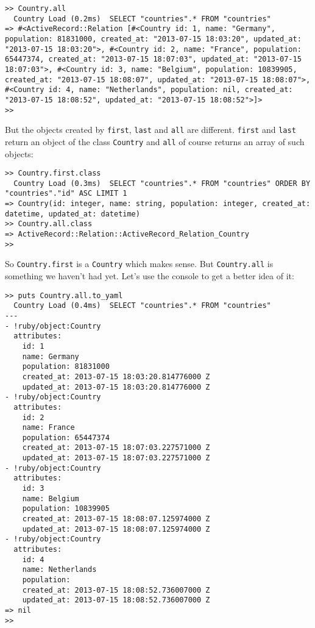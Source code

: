 \documentclass[a4paper]{book}
\begin{document}
\begin{shaded}\begin{verbatim}
>> Country.all
  Country Load (0.2ms)  SELECT "countries".* FROM "countries"
=> #<ActiveRecord::Relation [#<Country id: 1, name: "Germany", population: 81831000, created_at: "2013-07-15 18:03:20", updated_at: "2013-07-15 18:03:20">, #<Country id: 2, name: "France", population: 65447374, created_at: "2013-07-15 18:07:03", updated_at: "2013-07-15 18:07:03">, #<Country id: 3, name: "Belgium", population: 10839905, created_at: "2013-07-15 18:08:07", updated_at: "2013-07-15 18:08:07">, #<Country id: 4, name: "Netherlands", population: nil, created_at: "2013-07-15 18:08:52", updated_at: "2013-07-15 18:08:52">]>
>>
\end{verbatim}\end{shaded}

But the objects created by \texttt{first}, \texttt{last} and \texttt{all} are different. \texttt{first} and \texttt{last} return an object of the class \texttt{Country} and \texttt{all} of course returns an array of such objects:

\begin{shaded}\begin{verbatim}
>> Country.first.class
  Country Load (0.3ms)  SELECT "countries".* FROM "countries" ORDER BY "countries"."id" ASC LIMIT 1
=> Country(id: integer, name: string, population: integer, created_at: datetime, updated_at: datetime)
>> Country.all.class
=> ActiveRecord::Relation::ActiveRecord_Relation_Country
>>
\end{verbatim}\end{shaded}

So \texttt{Country.first} is a \texttt{Country} which makes sense. But \texttt{Country.all} is something we haven't had yet. Let's use the console to get a better idea of it:

\begin{shaded}\begin{verbatim}
>> puts Country.all.to_yaml
  Country Load (0.4ms)  SELECT "countries".* FROM "countries"
---
- !ruby/object:Country
  attributes:
    id: 1
    name: Germany
    population: 81831000
    created_at: 2013-07-15 18:03:20.814776000 Z
    updated_at: 2013-07-15 18:03:20.814776000 Z
- !ruby/object:Country
  attributes:
    id: 2
    name: France
    population: 65447374
    created_at: 2013-07-15 18:07:03.227571000 Z
    updated_at: 2013-07-15 18:07:03.227571000 Z
- !ruby/object:Country
  attributes:
    id: 3
    name: Belgium
    population: 10839905
    created_at: 2013-07-15 18:08:07.125974000 Z
    updated_at: 2013-07-15 18:08:07.125974000 Z
- !ruby/object:Country
  attributes:
    id: 4
    name: Netherlands
    population:
    created_at: 2013-07-15 18:08:52.736007000 Z
    updated_at: 2013-07-15 18:08:52.736007000 Z
=> nil
>>
\end{verbatim}\end{shaded}
\end{document}
